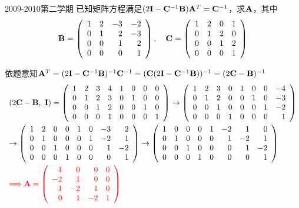 \begin{frame}
\begin{scriptsize}
\begin{exampleblock}{2009-2010第二学期}
已知矩阵方程满足$(2\mathbf{I}-\mathbf{C}^{-1}\mathbf{B})\mathbf{A}^T=\mathbf{C}^{-1}$，求$\mathbf{A}$，其中
$$\mathbf{B}=\left(
\begin{array}{rrrr}
1&2&-3&-2\\
0&1&2&-3\\
0&0&1&2\\
0&0&0&1
\end{array}
\right),\quad
\mathbf{C}=\left(
\begin{array}{rrrr}
1&2&0&1\\
0&1&2&0\\
0&0&1&2\\
0&0&0&1
\end{array}
\right)$$
\end{exampleblock}
\pause\jiename
依题意知$\mathbf{A}^T=(2\mathbf{I}-\mathbf{C}^{-1}\mathbf{B})^{-1}\mathbf{C}^{-1}=(\mathbf{C}(2\mathbf{I}-\mathbf{C}^{-1}\mathbf{B}))^{-1}=(2\mathbf{C}-\mathbf{B})^{-1}$
$$
\begin{array}{l}
  (2\mathbf{C}-\mathbf{B},~\mathbf{I})=\left(
  \begin{array}{rrrrrrrr}
    1&2&3&4&1&0&0&0\\
    0&1&2&3&0&1&0&0\\
    0&0&1&2&0&0&1&0\\
    0&0&0&1&0&0&0&1
  \end{array}
  \right)\rightarrow\left(
  \begin{array}{rrrrrrrr}
    1&2&3&0&1&0&0&-4\\
    0&1&2&0&0&1&0&-3\\
    0&0&1&0&0&0&1&-2\\
    0&0&0&1&0&0&0&1
  \end{array}
  \right)\\[0.3in]
\rightarrow\left(
  \begin{array}{rrrrrrrr}
    1&2&0&0&1&0&-3&2\\
    0&1&0&0&0&1&-2&1\\
    0&0&1&0&0&0&1&-2\\
    0&0&0&1&0&0&0&1
  \end{array}
  \right)
\rightarrow\left(
  \begin{array}{rrrrrrrr}
    1&0&0&0&1&-2&1&0\\
    0&1&0&0&0&1&-2&1\\
    0&0&1&0&0&0&1&-2\\
    0&0&0&1&0&0&0&1   
  \end{array}
  \right)\\[0.3in]
  \textcolor{red}{\Longrightarrow \mathbf{A}=\left(
  \begin{array}{rrrr}
    1&0&0&0\\
    -2&1&0&0\\
    1&-2&1&0\\
    0&1&-2&1   
  \end{array}
  \right)
}
\end{array}
$$

\end{scriptsize}
\end{frame}

